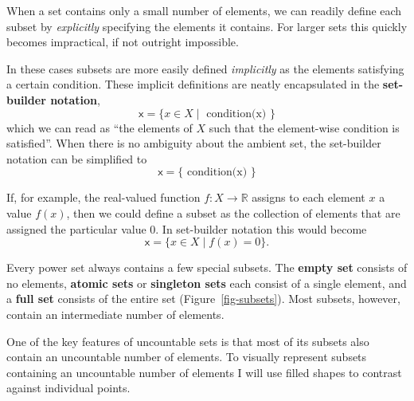\documentclass[
  letterpaper,
  DIV=11,
  numbers=noendperiod]{scrartcl}
\begin{document}
When a set contains only a small number of elements, we can readily
define each subset by \emph{explicitly} specifying the elements it
contains. For larger sets this quickly becomes impractical, if not
outright impossible.

In these cases subsets are more easily defined \emph{implicitly} as the
elements satisfying a certain condition. These implicit definitions are
neatly encapsulated in the \textbf{set-builder notation}, \[
\mathsf{x} = \{ x \in X \mid \text{ condition(x) } \}
\] which we can read as ``the elements of \(X\) such that the
element-wise condition is satisfied''. When there is no ambiguity about
the ambient set, the set-builder notation can be simplified to \[
\mathsf{x} = \{ \text{ condition(x) } \}
\]

If, for example, the real-valued function
\(f : X \rightarrow \mathbb{R}\) assigns to each element \(x\) a value
\(f(x)\), then we could define a subset as the collection of elements
that are assigned the particular value \(0\). In set-builder notation
this would become \[
\mathsf{x} = \{ x \in X \mid f(x) = 0 \}.
\]

Every power set always contains a few special subsets. The \textbf{empty
set} consists of no elements, \textbf{atomic sets} or \textbf{singleton
sets} each consist of a single element, and a \textbf{full set} consists
of the entire set (Figure~\ref{fig-subsets}). Most subsets, however,
contain an intermediate number of elements.

One of the key features of uncountable sets is that most of its subsets
also contain an uncountable number of elements. To visually represent
subsets containing an uncountable number of elements I will use filled
shapes to contrast against individual points.
\end{document}

